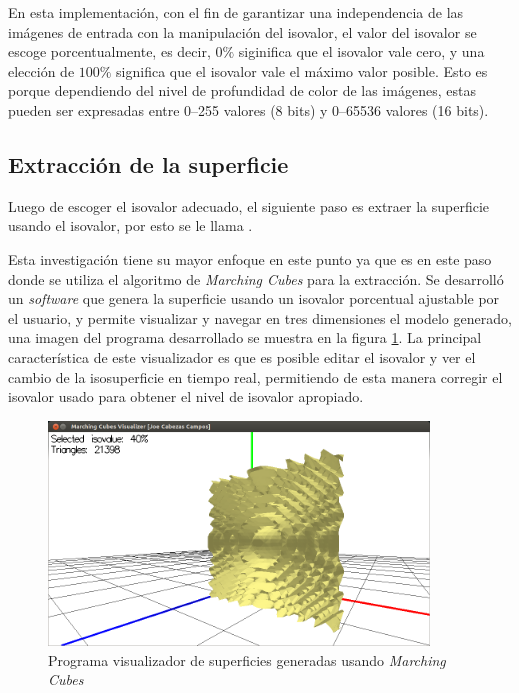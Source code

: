 En esta implementación, con el fin de garantizar una independencia de las imágenes de entrada con la manipulación del isovalor, el valor del isovalor se escoge porcentualmente, es decir, $0\%$ siginifica que el isovalor vale cero, y una elección de $100\%$ significa que el isovalor vale el máximo valor posible. Esto es porque dependiendo del nivel de profundidad de color de las imágenes, estas pueden ser expresadas entre 0--255 valores (8 bits) y 0--65536 valores (16 bits).

\subsection{Extracción de la superficie}
\label{ch:propuesta:sec:extraccionDeLaSuperficie}

Luego de escoger el isovalor adecuado, el siguiente paso es extraer la superficie usando el isovalor, por esto se le llama .

Esta investigación tiene su mayor enfoque en este punto ya que es en este paso donde se utiliza el algoritmo de \emph{Marching Cubes} para la extracción. Se desarrolló un \emph{software} que genera la superficie usando un isovalor porcentual ajustable por el usuario, y permite visualizar y navegar en tres dimensiones el modelo generado, una imagen del programa desarrollado se muestra en la figura \ref{f:flujoDeTrabajo:visualizer_1}. La principal característica de este visualizador es que es posible editar el isovalor y ver el cambio de la isosuperficie en tiempo real, permitiendo de esta manera corregir el isovalor usado para obtener el nivel de isovalor apropiado.

\begin{figure}[h]
\centering
	\includegraphics[width=0.9\textwidth]{images/visualizer/visualizer_1.png}
\caption{Programa visualizador de superficies generadas usando \emph{Marching Cubes}}
\label{f:flujoDeTrabajo:visualizer_1}
\end{figure}

